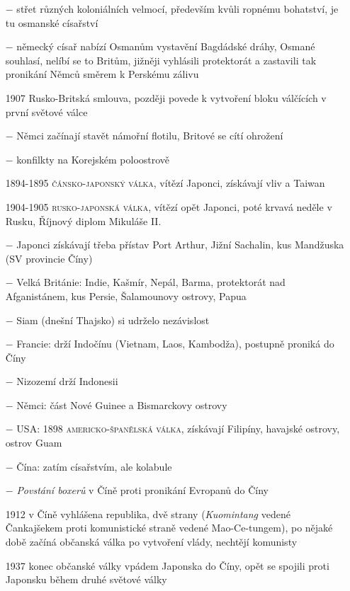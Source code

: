 \documentclass{article}
\begin{document}
\begin{itemize}
    \vspace{-0.5em}
    \setlength\itemsep{0.15em}
    \item[$-$] střet různých koloniálních velmocí, především kvůli ropnému bohatství, je tu osmanské císařství
    \item[$-$] německý císař nabízí Osmanům vystavění Bagdádské dráhy, Osmané souhlasí, nelíbí se to Britům, jižněji vyhlásili protektorát a zastavili tak pronikání Němců směrem k Perskému zálivu
    \item[1907] Rusko-Britská smlouva, později povede k vytvoření bloku válčících v první světové válce
    \item[$-$] Němci začínají stavět námořní flotilu, Britové se cítí ohrožení
    \item[$-$] konfilkty na Korejském poloostrově
    \item[1894-1895] \textsc{čánsko-japonský válka}, vítězí Japonci, získávají vliv a Taiwan
    \item[1904-1905] \textsc{rusko-japonská válka}, vítězí opět Japonci, poté krvavá neděle v Rusku, Říjnový diplom Mikuláše II.
    \item[$-$] Japonci získávají třeba přístav Port Arthur, Jižní Sachalin, kus Mandžuska (SV provincie Číny)
    \item[$-$] Velká Británie: Indie, Kašmír, Nepál, Barma, protektorát nad Afganistánem, kus Persie, Šalamounovy ostrovy, Papua
    \item[$-$] Siam (dnešní Thajsko) si udrželo nezávislost
    \item[$-$] Francie: drží Indočínu (Vietnam, Laos, Kambodža), postupně proniká do Číny
    \item[$-$] Nizozemí drží Indonesii
    \item[$-$] Němci: část Nové Guinee a Bismarckovy ostrovy
    \item[$-$] USA: 1898 \textsc{americko-španělská válka}, získávají Filipíny, havajské ostrovy, ostrov Guam
    \item[$-$] Čína: zatím císařstvím, ale kolabule
    \item[$-$] \textit{Povstání boxerů} v Číně proti pronikání Evropanů do Číny
    \item[1912] v Číně vyhlášena republika, dvě strany (\textit{Kuomintang} vedené Čankajšekem proti komunistické straně vedené Mao-Ce-tungem), po nějaké době začíná občanská válka po vytvoření vlády, nechtějí komunisty
    \item[1937] konec občanské války vpádem Japonska do Číny, opět se spojili proti Japonsku během druhé světové války
\end{itemize}
\end{document}

